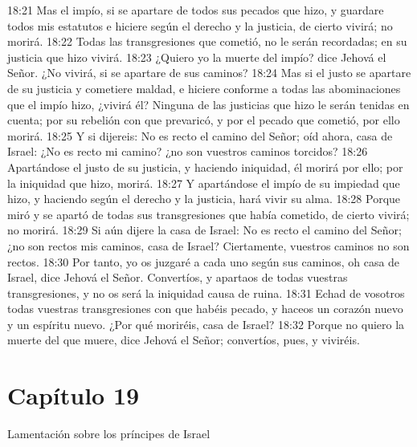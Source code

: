 18:21 Mas el impío, si se apartare de todos sus pecados que hizo, y guardare todos mis estatutos e hiciere según el derecho y la justicia, de cierto vivirá; no morirá.   
18:22 Todas las transgresiones que cometió, no le serán recordadas; en su justicia que hizo vivirá.   
18:23 ¿Quiero yo la muerte del impío? dice Jehová el Señor. ¿No vivirá, si se apartare de sus caminos?   
18:24 Mas si el justo se apartare de su justicia y cometiere maldad, e hiciere conforme a todas las abominaciones que el impío hizo, ¿vivirá él? Ninguna de las justicias que hizo le serán tenidas en cuenta; por su rebelión con que prevaricó, y por el pecado que cometió, por ello morirá.   
18:25 Y si dijereis: No es recto el camino del Señor; oíd ahora, casa de Israel: ¿No es recto mi camino? ¿no son vuestros caminos torcidos?   
18:26 Apartándose el justo de su justicia, y haciendo iniquidad, él morirá por ello; por la iniquidad que hizo, morirá.   
18:27 Y apartándose el impío de su impiedad que hizo, y haciendo según el derecho y la justicia, hará vivir su alma.   
18:28 Porque miró y se apartó de todas sus transgresiones que había cometido, de cierto vivirá; no morirá.   
18:29 Si aún dijere la casa de Israel: No es recto el camino del Señor; ¿no son rectos mis caminos, casa de Israel? Ciertamente, vuestros caminos no son rectos.   
18:30 Por tanto, yo os juzgaré a cada uno según sus caminos, oh casa de Israel, dice Jehová el Señor. Convertíos, y apartaos de todas vuestras transgresiones, y no os será la iniquidad causa de ruina.   
18:31 Echad de vosotros todas vuestras transgresiones con que habéis pecado, y haceos un corazón nuevo y un espíritu nuevo. ¿Por qué moriréis, casa de Israel?   
18:32 Porque no quiero la muerte del que muere, dice Jehová el Señor; convertíos, pues, y viviréis.   
\section*{Capítulo 19 } 
Lamentación sobre los príncipes de Israel   
  
